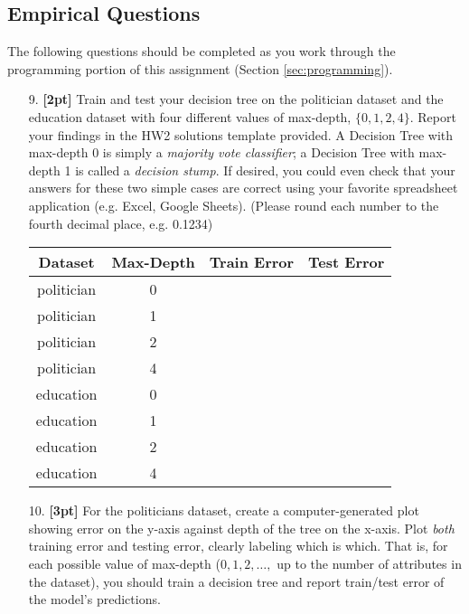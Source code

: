 \documentclass[11pt]{article}
\numberwithin{equation}{section} %
\numberwithin{figure}{section} %
\numberwithin{table}{section} %
\begin{document}
\clearpage
\subsection{Empirical Questions}
\label{sec:empirical}

The following questions should be completed as you work through the programming portion of this assignment (Section \ref{sec:programming}).

 \begin{enumerate}
    \item[9.] \textbf{[2pt]} Train and test your decision tree on the politician dataset and the education dataset with four different values of max-depth, $\{0,1,2,4\}$. Report your findings in the HW2 solutions template provided. A Decision Tree with max-depth 0 is simply a \emph{majority vote classifier}; a Decision Tree with max-depth 1 is called a \emph{decision stump}. If desired, you could even check that your answers for these two simple cases are correct using your favorite spreadsheet application (e.g. Excel, Google Sheets). (Please round each number to the fourth decimal place, e.g. 0.1234)
    
    \begin{center}
    \begin{tabular}{cc|c|c}
        \toprule
      {\bf Dataset}   & {\bf Max-Depth} & {\bf Train Error} & {\bf Test Error} \\
      \midrule
        politician & 0 & & \\
        politician & 1 & & \\
        politician & 2 & & \\
        politician & 4 & & \\
        \midrule
        education & 0 & & \\
        education & 1 & & \\
        education & 2 & & \\
        education & 4 & & \\
        \bottomrule
    \end{tabular}
    \end{center}
    
    
    \item[10.] \textbf{[3pt]} For the politicians dataset, create a computer-generated plot showing error on the y-axis against depth of the tree on the x-axis. Plot \emph{both} training error and testing error, clearly labeling which is which.  That is, for each possible value of max-depth ($0, 1, 2, \ldots,$ up to the number of attributes in the dataset), you should train a decision tree and report train/test error of the model's predictions.
    

\end{enumerate}
\end{document}
